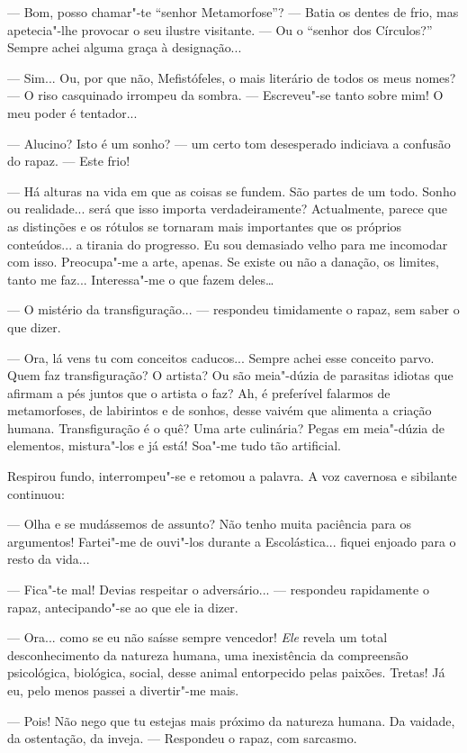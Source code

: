 --- Bom, posso chamar"-te ``senhor Metamorfose''? ---  Batia os dentes de frio,
mas apetecia"-lhe provocar o seu ilustre visitante. --- Ou o ``senhor dos
Círculos?'' Sempre achei alguma graça à designação...

--- Sim... Ou, por que não, Mefistófeles, o mais literário de todos os
meus nomes? --- O riso casquinado irrompeu da sombra. --- Escreveu"-se tanto
sobre mim! O meu poder é tentador...

--- Alucino? Isto é um sonho? --- um certo tom desesperado indiciava a
confusão do rapaz. --- Este frio!

--- Há alturas na vida em que as coisas se fundem. São partes de um todo.
Sonho ou realidade... será que isso importa verdadeiramente?
Actualmente, parece que as distinções e os rótulos se tornaram mais
importantes que os próprios conteúdos... a tirania do progresso. Eu sou
demasiado velho para me incomodar com isso. Preocupa"-me a arte, apenas.
Se existe ou não a danação, os limites, tanto me faz... Interessa"-me o
que fazem deles\ldots{}

--- O mistério da transfiguração... --- respondeu timidamente o rapaz, sem
saber o que dizer.

--- Ora, lá vens tu com conceitos caducos... Sempre achei esse conceito
parvo. Quem faz transfiguração? O artista? Ou são meia"-dúzia de
parasitas idiotas que afirmam a pés juntos que o artista o faz? Ah, é
preferível falarmos de metamorfoses, de labirintos e de sonhos, desse
vaivém que alimenta a criação humana. Transfiguração é o quê? Uma arte
culinária? Pegas em meia"-dúzia de elementos, mistura"-los e já está!
Soa"-me tudo tão artificial.

Respirou fundo, interrompeu"-se e retomou a palavra. A voz cavernosa e
sibilante continuou:

--- Olha e se mudássemos de assunto? Não tenho muita paciência para os
argumentos! Fartei"-me de ouvi"-los durante a Escolástica... fiquei
enjoado para o resto da vida...

--- Fica"-te mal! Devias respeitar o adversário... --- respondeu rapidamente
o rapaz, antecipando"-se ao que ele ia dizer.

--- Ora... como se eu não saísse sempre vencedor! \emph{Ele} revela um
total desconhecimento da natureza humana, uma inexistência da
compreensão psicológica, biológica, social, desse animal entorpecido
pelas paixões. Tretas! Já eu, pelo menos passei a divertir"-me mais.

--- Pois! Não nego que tu estejas mais próximo da natureza humana. Da
vaidade, da ostentação, da inveja. --- Respondeu o rapaz, com sarcasmo.

